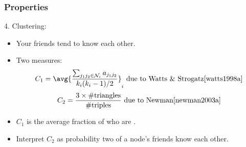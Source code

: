 \begin{frame}
  \frametitle{Properties}

  \begin{block}{4. Clustering:}
    \begin{itemize}
    \item<2-> Your friends tend to know each other.
    \item<3-> Two measures:
      $$ C_1 = \avg{\frac{\sum_{j_1 j_2 \in {\cal N}_i} a_{j_1 j_2}}{k_i(k_i-1)/2}}_{i} 
      \mbox{\ due to Watts \& Strogatz\cite{watts1998a}}
      $$  
      $$ C_2 = \frac{3 \times \rm\#triangles}{\rm \#triples} 
      \mbox{\ due to Newman\cite{newman2003a}}
      $$ 
    \item<4-> $C_1$ is the \alert{average fraction} 
      of 
       who are .
    \item<5->
      Interpret $C_2$ as probability two of a node's friends
      know each other.
    \end{itemize}
  \end{block}

\end{frame}


